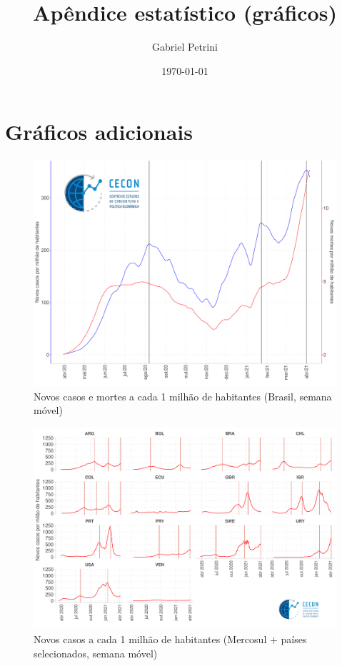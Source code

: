 \documentclass[11pt]{article}
\author{Gabriel Petrini}
\date{\today}
\title{Apêndice estatístico (gráficos)}
\begin{document}
\maketitle

\section*{Gráficos adicionais}
\label{sec:orgba1b3c3}

\begin{figure}[htbp]
\caption{Novos casos e mortes a cada 1 milhão de habitantes (Brasil, semana móvel)}
\centering
\includegraphics[width=.9\linewidth]{./figs/COVID/Estados/Brasil.pdf}
\end{figure}

\begin{figure}[htbp]
\caption{Novos casos a cada 1 milhão de habitantes (Mercosul + países selecionados, semana móvel)}
\centering
\includegraphics[width=.9\linewidth]{./figs/COVID/Picos.pdf}
\end{figure}
\end{document}
